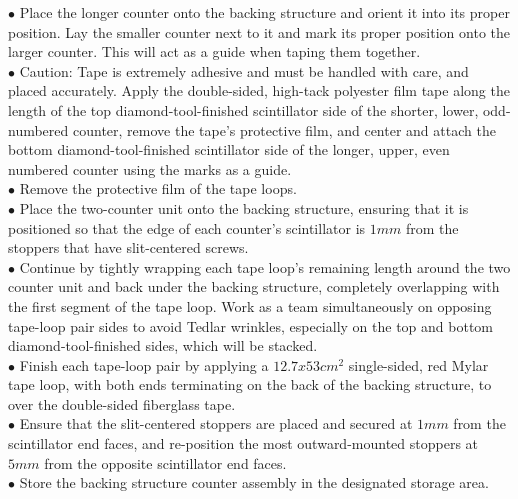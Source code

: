 $\bullet$ Place the longer counter onto the backing structure and orient it into its proper position. Lay the smaller counter next to it and mark its proper position onto the larger counter. This will act as a guide when taping them together.\\
$\bullet$ Caution: Tape is extremely adhesive and must be handled with care, and placed accurately. Apply the double-sided, high-tack polyester film tape along the length of the top diamond-tool-finished scintillator side of the shorter, lower, odd-numbered counter, remove the tape's protective film, and center and attach the bottom diamond-tool-finished scintillator side of the longer, upper, even numbered counter using the marks as a guide.\\
$\bullet$ Remove the protective film of the tape loops.\\
$\bullet$ Place the two-counter unit onto the backing structure, ensuring that it is positioned so that the edge of each counter's scintillator is $1 mm$ from the stoppers that have slit-centered screws.\\
$\bullet$ Continue by tightly wrapping each tape loop's remaining length around the two counter unit and back under the backing structure, completely overlapping with the first segment of the tape loop. Work as a team simultaneously on opposing tape-loop pair sides to avoid Tedlar wrinkles, especially on the top and bottom diamond-tool-finished sides, which will be stacked.\\
$\bullet$ Finish each tape-loop pair by applying a $12.7 x 53 cm^{2}$ single-sided, red Mylar tape loop, with both ends terminating on the back of the backing structure, to over the double-sided fiberglass tape.\\
$\bullet$ Ensure that the slit-centered stoppers are placed and secured at $1 mm$ from the scintillator end faces, and re-position the most outward-mounted stoppers at $5 mm$ from the opposite scintillator end faces.\\
$\bullet$ Store the backing structure counter assembly in the designated storage area.